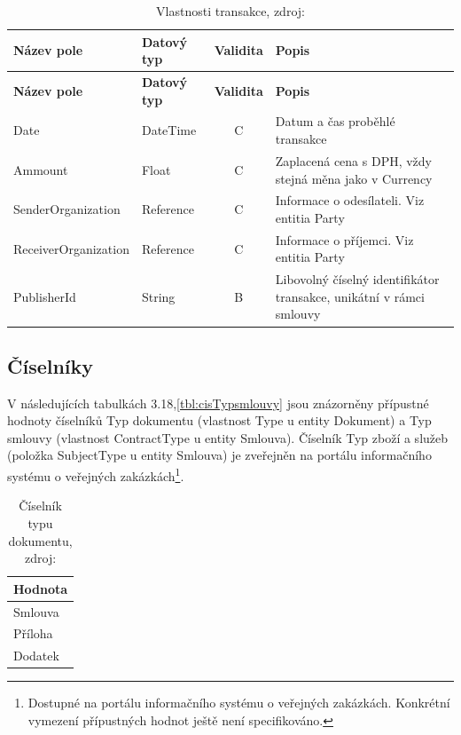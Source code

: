 \begin{center}
\begin{longtable}{lp{20mm}cp{65mm}}
\label{grid_mlmmh} \\
\multicolumn{1}{l}{\textbf{Název pole}} & 
\multicolumn{1}{l}{\textbf{Datový typ}} & 
\multicolumn{1}{l}{\textbf{Validita}} & 
\multicolumn{1}{l}{\textbf{Popis}} \\ \hline 
\endfirsthead
\multicolumn{1}{l}{\textbf{Název pole}} & 
\multicolumn{1}{l}{\textbf{Datový typ}} & 
\multicolumn{1}{l}{\textbf{Validita}} & 
\multicolumn{1}{l}{\textbf{Popis}} \\ \hline 
\hline
\endhead
\endfoot
\caption[Vlastnosti transakce]{Vlastnosti transakce, zdroj:\cite{metodika, standard}}
\endlastfoot
\rowcolor{validateC}Date & DateTime & C & Datum a čas proběhlé transakce \\
\rowcolor{validateC}Ammount & Float & C & Zaplacená cena s DPH, vždy stejná měna jako v Currency \\
\rowcolor{validateC}SenderOrganization & Reference & C & Informace o odesílateli. Viz entitia Party \\
\rowcolor{validateC}ReceiverOrganization & Reference & C & Informace o příjemci. Viz entitia Party \\
\rowcolor{validateB}PublisherId & String & B & Libovolný číselný identifikátor transakce, unikátní v rámci smlouvy \\
\end{longtable}
\end{center}

\newpage

\subsection{Číselníky}

V následujících tabulkách 3.18,\ref{tbl:cisTypsmlouvy} jsou znázorněny přípustné hodnoty číselníků Typ dokumentu (vlastnost Type u entity Dokument) a Typ smlouvy (vlastnost ContractType u entity Smlouva). Číselník Typ zboží a služeb (položka SubjectType u entity Smlouva) je zveřejněn na portálu informačního systému o veřejných zakázkách\footnote{Dostupné na portálu informačního systému o veřejných zakázkách\cite{isvz}. Konkrétní vymezení přípustných hodnot ještě není specifikováno.}.

\begin{table}[h]
\centering
\begin{tabular}{l}
\label{tbl:cisTypDokumentu} \\
\textbf{Hodnota} \\
\hline
\rowcolor{validateB}Smlouva \\
\rowcolor{validateB}Příloha \\
\rowcolor{validateB}Dodatek \\
\end{tabular}
\caption[Číselník typu dokumentu]{Číselník typu dokumentu, zdroj:\cite{metodika, standard}}
\end{table}

